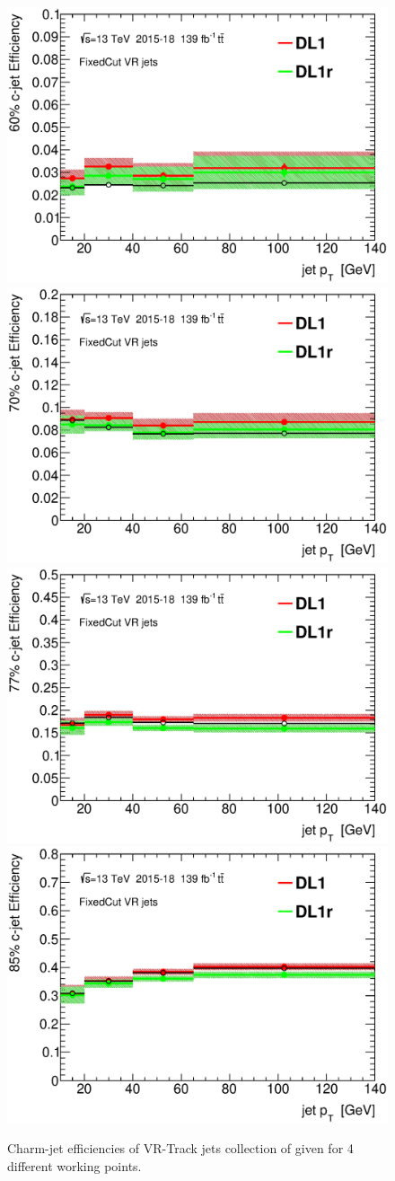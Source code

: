 \documentclass[letterpaper,12pt]{article}
\begin{document}
\begin{figure}[H]
\includegraphics[width=.45\textwidth]{SFplots_december/DL1allVRJetsDec_DL1rallVRJetsDec/eff60.eps}
\includegraphics[width=.45\textwidth]{SFplots_december/DL1allVRJetsDec_DL1rallVRJetsDec/eff70.eps}\\
\includegraphics[width=.45\textwidth]{SFplots_december/DL1allVRJetsDec_DL1rallVRJetsDec/eff77.eps}
\includegraphics[width=.45\textwidth]{SFplots_december/DL1allVRJetsDec_DL1rallVRJetsDec/eff85.eps}\\
\caption{Charm-jet efficiencies of VR-Track jets collection of 
given for 4 different working points.} \label{fig:Dec_eff_VRJets}
\end{figure}

\end{document}
